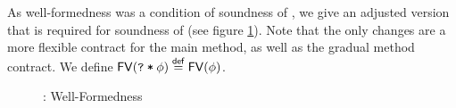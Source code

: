 As well-formedness was a condition of soundness of \svlidf, we give an adjusted version that is required for soundness of \gvlidf (see figure \ref{fig:gidf-wf}).
Note that the only changes are a more flexible contract for the main method, as well as the gradual method contract.
We define $\textup{\textmd{\textsf{FV}}}(\textup{\texttt{\textup{\texttt{?}}\:*\:\ensuremath{\phi}}}) \overset{\textup{\textmd{\textsf{def}}}}{=} \textup{\textmd{\textsf{FV}}}(\phi)$.

\begin{figure}[h]
    
    \caption{\gvlidf: Well-Formedness}
    \label{fig:gidf-wf}
\end{figure}

